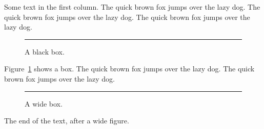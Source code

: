 \documentclass{article}
\begin{document}
\twocolumn
Some text in the first column. The quick brown fox jumps over the lazy
dog. The quick brown fox jumps over the lazy dog. The quick brown fox
jumps over the lazy dog.
\begin{figure}[t]
\centering
\rule{3cm}{2cm}
\caption{A black box.}\label{fig:box}
\end{figure}
Figure~\ref{fig:box} shows a box. The quick brown fox jumps over the lazy
dog. The quick brown fox jumps over the lazy dog.

\begin{figure}
\centering
\rule{8cm}{1cm}
\caption{A wide box.}
\end{figure}
The end of the text, after a wide figure.
\end{document}
